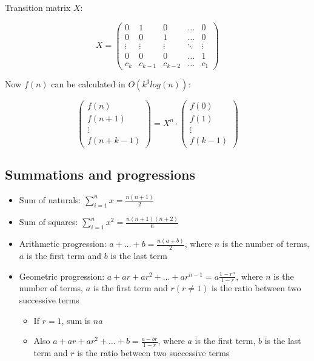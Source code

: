 \documentclass{article}
\begin{document}
Transition matrix $X$:

\[
	X =
	\begin{pmatrix}
		0 & 1 & 0 & \dots & 0 \\
		0 & 0 & 1 & \dots & 0 \\
		\vdots & \vdots & \vdots & \ddots & \vdots \\
		0 & 0 & 0 & \dots & 1 \\
		c_k & c_{k-1} & c_{k-2} & \dots & c_1
	\end{pmatrix}
\]

Now $f(n)$ can be calculated in $O(k^3 log(n))$:

\[
	\begin{pmatrix}
		f(n) \\
		f(n+1) \\
		\vdots \\
		f(n+k-1)
	\end{pmatrix}
	= X^n \cdot
	\begin{pmatrix}
		f(0) \\
		f(1) \\
		\vdots \\
		f(k-1)
	\end{pmatrix}
\]



\subsection {Summations and progressions}

\begin{itemize}

	\item Sum of naturals: $\sum_{i=1}^{n} x = \frac{n(n+1)}{2}$
	\item Sum of squares: $\sum_{i=1}^{n} x^2 = \frac{n(n+1)(n+2)}{6}$
	\item Arithmetic progression: $a + \dots + b = \frac{n(a+b)}{2}$, where $n$ is the number of terms, $a$ is the first term and $b$ is the last term
	\item Geometric progression: $a + ar + ar^2 + \dots + ar^{n-1} = a \frac{1-r^n}{1-r}$, where $n$ is the number of terms, $a$ is the first term and $r (r \neq 1)$ is the ratio between two successive terms
	\begin{itemize}
		\item If $r = 1$, sum is $na$
		\item Also $a + ar + ar^2 + \dots + b = \frac{a-br}{1-r}$, where $a$ is the first term, $b$ is the last term and $r$ is the ratio between two successive terms
	\end{itemize}

\end{itemize}
\end{document}
